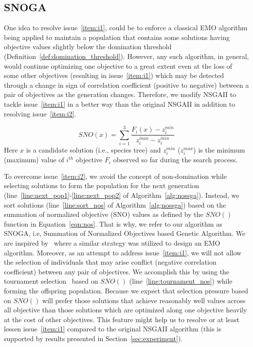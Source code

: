 \subsection{SNOGA}
One idea to resolve issue~\ref{item:i1}, could be to enforce a classical EMO algorithm being applied to maintain a population that contains some solutions having objective values slightly below the domination threshold (Definition~\ref{def:domination_threshold}). However, any such algorithm, in general, would continue optimizing one objective to a great extent even at the loss of some other objectives (resulting in issue~\ref{item:i1}) which may be detected through a change in sign of correlation coefficient (positive to negative)  between a pair of objectives as the generation changes. 
Therefore, we modify NSGAII to tackle issue~\ref{item:i1} in a better way than the original NSGAII in addition to resolving issue~\ref{item:i2}.  

\begin{equation}\label{eqn:nos}
SNO(x) = \sum_{i=1}^{3} \frac{F_i(x)-z_i^{min}}{z_i^{max}-z_i^{min}}
\end{equation}
Here $x$ is a candidate solution (i.e., species tree) and $z_i^{min}$ ($z_i^{max}$) is the minimum (maximum) value of $i^{th}$ objective $F_i$ observed so far during the search process.

To overcome issue~\ref{item:i2}, we avoid the concept of non-domination while selecting solutions to form the population for the next generation (line~\ref{line:next_pop1}-\ref{line:next_pop2} of Algorithm~\ref{alg:nossga}). Instead, we sort solutions (line~\ref{line:sort_nos} of Algorithm~\ref{alg:nossga}) based on the summation of normalized objective (SNO) values as defined by the $SNO()$ function in Equation~\ref{eqn:nos}. That is why, we refer to our algorithm as SNOGA, i.e, Summation of Normalized Objectives based Genetic Algorithm. We are inspired by~\cite{qu2010multi} where a similar strategy was utilized to design an EMO algorithm. Moreover, as an attempt to address issue~\ref{item:i1}, we will not allow the selection of individuals that may arise conflict (negative correlation coefficient) between any pair of objectives. We accomplish this by using the tournament selection~\cite{goldberg1991comparative} based on $SNO()$ (line~\ref{line:tournament_nos}) while forming the offspring population.
Because we expect that selection pressure based on $SNO()$ will prefer those solutions that achieve reasonably well values across all objective than those solutions which are optimized along one objective heavily at the cost of other objectives. This feature might help us to resolve or at least lessen issue~\ref{item:i1} compared to the original NSGAII algorithm (this is supported by results presented in Section~\ref{sec:experiment}). 

